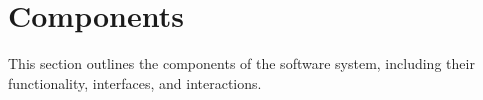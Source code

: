 \section{Components}
This section outlines the components of the software system, including their functionality, interfaces, and interactions.